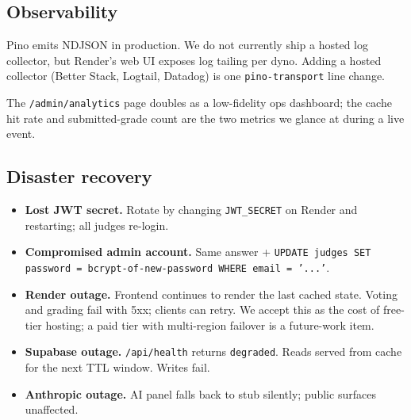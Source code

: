 \subsection{Observability}

Pino emits NDJSON in production. We do not currently ship a hosted log
collector, but Render's web UI exposes log tailing per dyno. Adding a
hosted collector (Better Stack, Logtail, Datadog) is one
\texttt{pino-transport} line change.

The \texttt{/admin/analytics} page doubles as a low-fidelity ops
dashboard; the cache hit rate and submitted-grade count are the two
metrics we glance at during a live event.

\subsection{Disaster recovery}

\begin{itemize}[leftmargin=*]
  \item \textbf{Lost JWT secret.} Rotate by changing
        \texttt{JWT\_SECRET} on Render and restarting; all judges
        re-login.
  \item \textbf{Compromised admin account.} Same answer + \texttt{UPDATE
        judges SET password = bcrypt-of-new-password WHERE email = '...'}.
  \item \textbf{Render outage.} Frontend continues to render the last
        cached state. Voting and grading fail with 5xx; clients can
        retry. We accept this as the cost of free-tier hosting; a paid
        tier with multi-region failover is a future-work item.
  \item \textbf{Supabase outage.} \texttt{/api/health} returns
        \texttt{degraded}. Reads served from cache for the next
        TTL window. Writes fail.
  \item \textbf{Anthropic outage.} AI panel falls back to stub silently;
        public surfaces unaffected.
\end{itemize}

